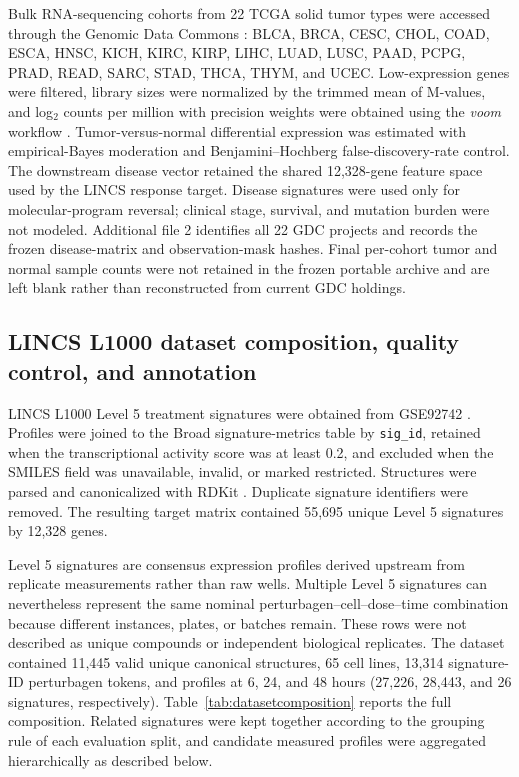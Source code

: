 Bulk RNA-sequencing cohorts from 22 TCGA solid tumor types were accessed through the Genomic Data Commons \cite{weinstein2013,grossman2016}: BLCA, BRCA, CESC, CHOL, COAD, ESCA, HNSC, KICH, KIRC, KIRP, LIHC, LUAD, LUSC, PAAD, PCPG, PRAD, READ, SARC, STAD, THCA, THYM, and UCEC. Low-expression genes were filtered, library sizes were normalized by the trimmed mean of M-values, and log$_2$ counts per million with precision weights were obtained using the \textit{voom} workflow \cite{law2014}. Tumor-versus-normal differential expression was estimated with empirical-Bayes moderation and Benjamini--Hochberg false-discovery-rate control. The downstream disease vector retained the shared 12,328-gene feature space used by the LINCS response target. Disease signatures were used only for molecular-program reversal; clinical stage, survival, and mutation burden were not modeled. Additional file 2 identifies all 22 GDC projects and records the frozen disease-matrix and observation-mask hashes. Final per-cohort tumor and normal sample counts were not retained in the frozen portable archive and are left blank rather than reconstructed from current GDC holdings.

\subsection{LINCS L1000 dataset composition, quality control, and annotation}

LINCS L1000 Level 5 treatment signatures were obtained from GSE92742 \cite{subramanian2017}. Profiles were joined to the Broad signature-metrics table by \texttt{sig\_id}, retained when the transcriptional activity score was at least 0.2, and excluded when the SMILES field was unavailable, invalid, or marked restricted. Structures were parsed and canonicalized with RDKit \cite{landrum2013}. Duplicate signature identifiers were removed. The resulting target matrix contained 55,695 unique Level 5 signatures by 12,328 genes.

Level 5 signatures are consensus expression profiles derived upstream from replicate measurements rather than raw wells. Multiple Level 5 signatures can nevertheless represent the same nominal perturbagen--cell--dose--time combination because different instances, plates, or batches remain. These rows were not described as unique compounds or independent biological replicates. The dataset contained 11,445 valid unique canonical structures, 65 cell lines, 13,314 signature-ID perturbagen tokens, and profiles at 6, 24, and 48 hours (27,226, 28,443, and 26 signatures, respectively). Table~\ref{tab:datasetcomposition} reports the full composition. Related signatures were kept together according to the grouping rule of each evaluation split, and candidate measured profiles were aggregated hierarchically as described below.


